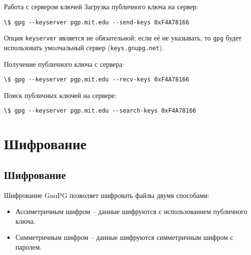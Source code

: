 \documentclass[presentation]{beamer}
\begin{document}
\begin{frame}[fragile]{Работа с сервером ключей}
  Загрузка публичного ключа на сервер:
  \begin{Verbatim}[commandchars=\\\[\]]
\$ gpg --keyserver pgp.mit.edu --send-keys 0xF4A78166
  \end{Verbatim}
  \vspace{5 mm}
  Опция \texttt{keyserver} является не обязательной; если её не
  указывать, то \texttt{gpg} будет использовать умолчальный сервер
  (\texttt{keys.gnupg.net}).\newline

  Получение публичного ключа с сервера:
  \begin{Verbatim}[commandchars=\\\[\]]
\$ gpg --keyserver pgp.mit.edu --recv-keys 0xF4A78166
  \end{Verbatim}

  Поиск публичных ключей на сервере:
  \begin{Verbatim}[commandchars=\\\[\]]
\$ gpg --keyserver pgp.mit.edu --search-keys 0xF4A78166
  \end{Verbatim}
\end{frame}


\section{Шифрование}

\subsection{Шифрование}

\begin{frame}[fragile]{Шифрование}
  GnuPG позволяет шифровать файлы двумя способами:
  \begin{itemize}
  \item Ассиметричным шифром -- данные шифруются с использованием
    публичного ключа.
  \item Симметричным шифром -- данные шифруются симметричным шифром с
    паролем.
  \end{itemize}
\end{frame}
\end{document}
